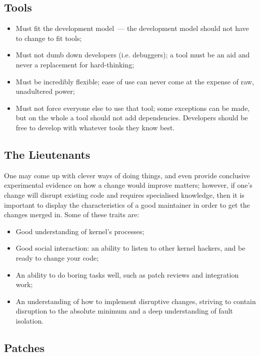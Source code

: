 \documentclass{memoir}
\begin{document}
\subsection{Tools}

\begin{itemize}
\item Must fit the development model~--- the development model should
  not have to change to fit tools;
\item Must not dumb down developers (i.e. debuggers); a tool must be
  an aid and never a replacement for hard-thinking;
\item Must be incredibly flexible; ease of use can never come at the
  expense of raw, unadultered power;
\item Must not force everyone else to use that tool; some exceptions
  can be made, but on the whole a tool should not add
  dependencies. Developers should be free to develop with whatever
  tools they know best.
\end{itemize}

\subsection{The Lieutenants}

One may come up with clever ways of doing things, and even provide
conclusive experimental evidence on how a change would improve
matters; however, if one's change will disrupt existing code and
requires specialised knowledge, then it is important to display the
characteristics of a good maintainer in order to get the changes
merged in. Some of these traits are:

\begin{itemize}
\item Good understanding of kernel's processes;
\item Good social interaction: an ability to listen to other kernel
  hackers, and be ready to change your code;
\item An ability to do boring tasks well, such as patch reviews and
  integration work;
\item An understanding of how to implement disruptive changes,
  striving to contain disruption to the absolute minimum and a deep
  understanding of fault isolation.
\end{itemize}

\subsection{Patches}
\end{document}
